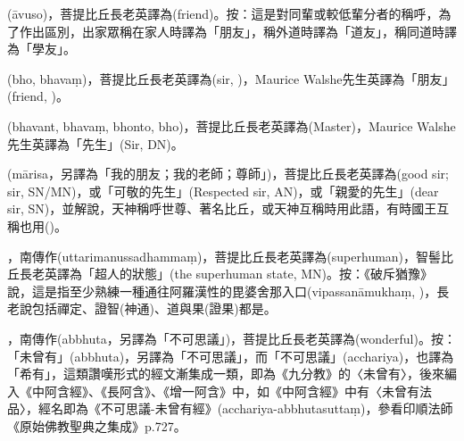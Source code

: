 \startitemgroup[noteitems]
\item{}(āvuso)，菩提比丘長老英譯為(friend)。按：這是對同輩或較低輩分者的稱呼，為了作出區別，出家眾稱在家人時譯為「朋友」，稱外道時譯為「道友」，稱同道時譯為「學友」。
\stopitemgroup

\startitemgroup[noteitems]
\item{}(bho, bhavaṃ)，菩提比丘長老英譯為(sir, )，Maurice Walshe先生英譯為「朋友」(friend, )。
\stopitemgroup

\startitemgroup[noteitems]
\item{}(bhavant, bhavaṃ, bhonto, bho)，菩提比丘長老英譯為(Master)，Maurice Walshe先生英譯為「先生」(Sir, DN)。
\stopitemgroup

\startitemgroup[noteitems]
\item{}(mārisa，另譯為「我的朋友；我的老師；尊師」)，菩提比丘長老英譯為(good sir; sir, SN/MN)，或「可敬的先生」(Respected sir, AN)，或「親愛的先生」(dear sir, SN)，並解說，天神稱呼世尊、著名比丘，或天神互稱時用此語，有時國王互稱也用()。
\stopitemgroup

\startitemgroup[noteitems]
\item{}，南傳作(uttarimanussadhammaṃ)，菩提比丘長老英譯為(superhuman)，智髻比丘長老英譯為「超人的狀態」(the superhuman state, MN)。按：《破斥猶豫》說，這是指至少熟練一種通往阿羅漢性的毘婆舍那入口(vipassanāmukhaṃ, )，長老說包括禪定、證智(神通)、道與果(證果)都是。
\stopitemgroup

\startitemgroup[noteitems]
\item{}，南傳作(abbhuta，另譯為「不可思議」)，菩提比丘長老英譯為(wonderful)。按：「未曾有」(abbhuta)，另譯為「不可思議」，而「不可思議」(acchariya)，也譯為「希有」，這類讚嘆形式的經文漸集成一類，即為《九分教》的〈未曾有〉，後來編入《中阿含經》、《長阿含》、《增一阿含》中，如《中阿含經》中有〈未曾有法品〉，經名即為《不可思議-未曾有經》(acchariya-abbhutasuttaṃ)，參看印順法師《原始佛教聖典之集成》p.727。
\stopitemgroup

